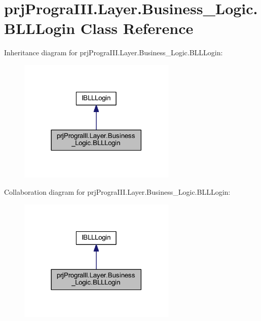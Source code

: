 \hypertarget{classprj_progra_i_i_i_1_1_layer_1_1_business___logic_1_1_b_l_l_login}{}\section{prj\+Progra\+I\+I\+I.\+Layer.\+Business\+\_\+\+Logic.\+B\+L\+L\+Login Class Reference}
\label{classprj_progra_i_i_i_1_1_layer_1_1_business___logic_1_1_b_l_l_login}


Inheritance diagram for prj\+Progra\+I\+I\+I.\+Layer.\+Business\+\_\+\+Logic.\+B\+L\+L\+Login\+:
\nopagebreak
\begin{figure}[H]
\begin{center}
\leavevmode
\includegraphics[width=213pt]{classprj_progra_i_i_i_1_1_layer_1_1_business___logic_1_1_b_l_l_login__inherit__graph}
\end{center}
\end{figure}


Collaboration diagram for prj\+Progra\+I\+I\+I.\+Layer.\+Business\+\_\+\+Logic.\+B\+L\+L\+Login\+:
\nopagebreak
\begin{figure}[H]
\begin{center}
\leavevmode
\includegraphics[width=213pt]{classprj_progra_i_i_i_1_1_layer_1_1_business___logic_1_1_b_l_l_login__coll__graph}
\end{center}
\end{figure}
